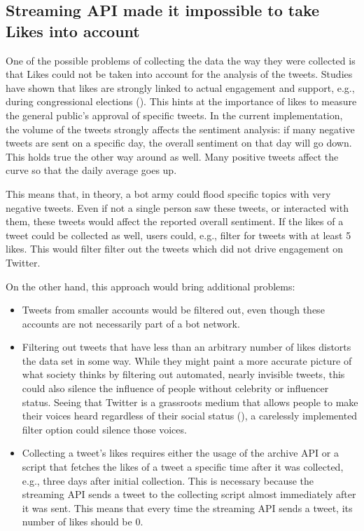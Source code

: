 \subsection*{Streaming API made it impossible to take Likes into account}
One of the possible problems of collecting the data the way they were collected is that Likes could not be taken into account for the analysis of the tweets. Studies have shown that likes are strongly linked to actual engagement and support, e.g., during congressional elections (\cite{macwilliamsForecastingCongressionalElections2015}). This hints at the importance of likes to measure the general public's approval of specific tweets. In the current implementation, the volume of the tweets strongly affects the sentiment analysis: if many negative tweets are sent on a specific day, the overall sentiment on that day will go down. This holds true the other way around as well. Many positive tweets affect the curve so that the daily average goes up.

This means that, in theory, a bot army could flood specific topics with very negative tweets. Even if not a single person saw these tweets, or interacted with them, these tweets would affect the reported overall sentiment. If the likes of a tweet could be collected as well, users could, e.g., filter for tweets with at least 5 likes. This would filter filter out the tweets which did not drive engagement on Twitter.

On the other hand, this approach would bring additional problems:
\begin{itemize}
    \item Tweets from smaller accounts would be filtered out, even though these accounts are not necessarily part of a bot network.
    \item Filtering out tweets that have less than an arbitrary number of likes distorts the data set in some way. While they might paint a more accurate picture of what society thinks by filtering out automated, nearly invisible tweets, this could also silence the influence of people without celebrity or influencer status. Seeing that Twitter is a grassroots medium that allows people to make their voices heard regardless of their social status (\cite{passmann2019alte}), a carelessly implemented filter option could silence those voices.
    \item Collecting a tweet's likes requires either the usage of the archive API or a script that fetches the likes of a tweet a specific time after it was collected, e.g., three days after initial collection. This is necessary because the streaming API sends a tweet to the collecting script almost immediately after it was sent. This means that every time the streaming API sends a tweet, its number of likes should be 0.
\end{itemize}

